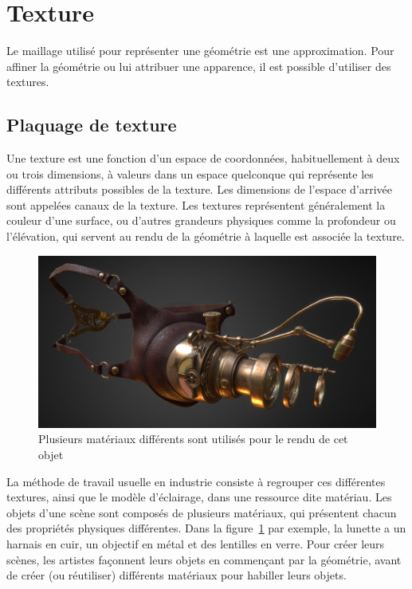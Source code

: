 \section{Texture}

Le maillage utilisé pour représenter une géométrie est une approximation. Pour affiner la géométrie ou lui attribuer une apparence, il est possible d'utiliser des textures.

\subsection{Plaquage de texture}

Une texture est une fonction d'un espace de coordonnées, habituellement à deux ou trois dimensions, à valeurs dans un espace quelconque qui représente les différents attributs possibles de la texture. Les dimensions de l'espace d'arrivée sont appelées canaux de la texture. Les textures représentent généralement la couleur d'une surface, ou d'autres grandeurs physiques comme la profondeur ou l'élévation, qui servent au rendu de la géométrie à laquelle est associée la texture.

\bigskip

\begin{figure}
    \centering
    \includegraphics[width=.65\textwidth]{contenu/resources/images/mutli-material-object}
    \caption[Rendu d'un objet comportant plusieurs matériaux]{Plusieurs matériaux différents sont utilisés pour le rendu de cet objet~\cite{lepkarepka_steampunk_2021}}
    \label{fig:multi-material}
\end{figure}

La méthode de travail usuelle en industrie consiste à regrouper ces différentes textures, ainsi que le modèle d'éclairage, dans une ressource dite matériau. Les objets d'une scène sont composés de plusieurs matériaux, qui présentent chacun des propriétés physiques différentes. Dans la figure~\ref{fig:multi-material} par exemple, la lunette a un harnais en cuir, un objectif en métal et des lentilles en verre. Pour créer leurs scènes, les artistes façonnent leurs objets en commençant par la géométrie, avant de créer (ou réutiliser) différents matériaux pour habiller leurs objets.

